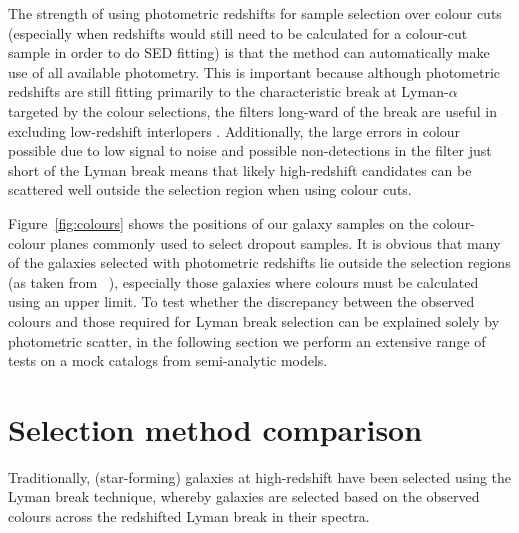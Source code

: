 The strength of using photometric redshifts for sample selection over colour cuts (especially when redshifts would still need to be calculated for a colour-cut sample in order to do SED fitting) is that the method can automatically make use of all available photometry. This is important because although photometric redshifts are still fitting primarily to the characteristic break at Lyman-$\alpha$ targeted by the colour selections, the filters long-ward of the break are useful in excluding low-redshift interlopers \citep{2011MNRAS.418.2074M}. Additionally, the large errors in colour possible due to low signal to noise and possible non-detections in the filter just short of the Lyman break means that likely high-redshift candidates can be scattered well outside the selection region when using colour cuts. 

Figure~\ref{fig:colours} shows the positions of our galaxy samples on the colour-colour planes commonly used to select dropout samples. It is obvious that many of the galaxies selected with photometric redshifts lie outside the selection regions (as taken from \citeauthor{2007ApJ...670..928B}~\citeyear{2007ApJ...670..928B}), especially those galaxies where colours must be calculated using an upper limit. To test whether the discrepancy between the observed colours and those required for Lyman break selection can be explained solely by photometric scatter, in the following section we perform an extensive range of tests on a mock catalogs from semi-analytic models.



\section{Selection method comparison}\label{app:selection}
Traditionally, (star-forming) galaxies at high-redshift have been selected using the Lyman break technique, whereby galaxies are selected based on the observed colours across the redshifted Lyman break in their spectra.

